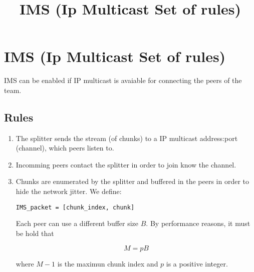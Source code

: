 \documentclass{minimal}
\title{IMS (Ip Multicast Set of rules)}
\begin{document}
\section{IMS (Ip Multicast Set of rules)}


IMS can be enabled if IP multicast is avaiable for connecting the
peers of the team.

\subsection{Rules}

\begin{enumerate}
\item The splitter sends the stream (of chunks) to a IP multicast
  address:port (channel), which peers listen to.

\item Incomming peers contact the splitter in order to join know the
  channel.

\item Chunks are enumerated by the splitter and buffered in the peers
  in order to hide the network jitter. We define:

\begin{verbatim}
IMS_packet = [chunk_index, chunk]
\end{verbatim}

   Each peer can use a different buffer size $B$. By performance
   reasons, it must be hold that
   
   \begin{equation}
     M = pB
   \label{eq:chunk_index_buffer_size_relation}
   \end{equation}

   where $M-1$ is the maximun chunk index and $p$ is a positive integer.
\end{enumerate}
\end{document}
